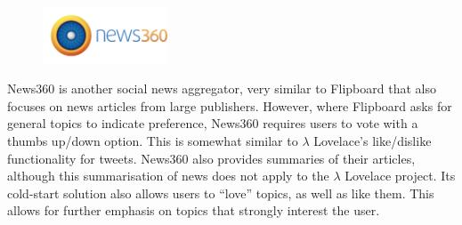 \documentclass{article}
\begin{document}
\begin{figure}[H]
    \includegraphics[width=0.33\textwidth,trim={1.2cm 1.3cm 0 0},clip]{news360_logo}
\end{figure}

\noindent News360 is another social news aggregator, very similar to Flipboard that also focuses on news articles from large publishers. However, where Flipboard asks for general topics to indicate preference,  News360 requires users to vote with a thumbs up/down option. This is somewhat similar to $\lambda$ Lovelace's like/dislike functionality for tweets. News360 also provides summaries of their articles, although this summarisation of news does not apply to the $\lambda$ Lovelace project. Its cold-start solution also allows users to “love” topics, as well as like them. This allows for further emphasis on topics that strongly interest the user.


\newpage
\end{document}
